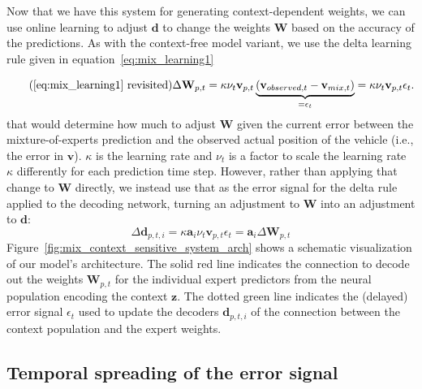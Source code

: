 Now that we have this system for generating context-dependent weights, we can use online learning to adjust $\mathbf{d}$ to change the weights $\mathbf{W}$ based on the accuracy of the predictions. 
As with the context-free model variant, we use the delta learning rule given in equation~\eqref{eq:mix_learning1}  

\begin{equation}
    \tag{\eqref{eq:mix_learning1} revisited}
    \Delta\mathbf{W}_{p,t} = \kappa \nu_{t} \mathbf{v}_{p,t} \underbrace{(\mathbf{v}_{observed,t}-\mathbf{v}_{mix,t})}_{=\epsilon_t} = \kappa \nu_{t} \mathbf{v}_{p,t} \epsilon_t.
\end{equation}
that would determine how much to adjust $\mathbf{W}$ given the current error between the mixture-of-experts prediction and the observed actual position of the vehicle (i.e., the error in $\mathbf{v}$).  
$\kappa$ is the learning rate and $\nu_{t}$ is a factor to scale the learning rate $\kappa$ differently for each prediction time step.
However, rather than applying that change to $\mathbf{W}$ directly, we instead use that as the error signal for the delta rule applied to the decoding network, turning an adjustment to $\mathbf{W}$ into an adjustment to $\mathbf{d}$:
\begin{equation}
\Delta\mathbf{d}_{p,t,i} = \kappa \mathbf{a}_i \nu_{t} \mathbf{v}_{p,t} \epsilon_t = \mathbf{a}_i \Delta\mathbf{W}_{p,t}
  \label{eq:learning2}
\end{equation}
Figure~\ref{fig:mix_context_sensitive_system_arch} shows a schematic visualization of our model's architecture.
The solid red line indicates the connection to decode out the weights $ \mathbf{W}_{p,t}$ for the individual expert predictors from the neural population encoding the context $ \mathbf{z}$.
The dotted green line indicates the (delayed) error signal $\epsilon_{t}$ used to update the decoders $ \mathbf{d}_{p,t,i}$ of the connection between the context population and the expert weights.

\subsection{Temporal spreading of the error signal}%
\label{subsec:temporal_spreading_of_the_error_signal}

